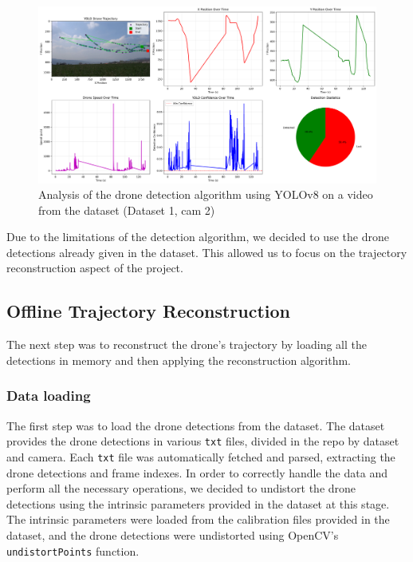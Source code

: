 \documentclass[11pt]{article}
\begin{document}
\begin{figure}[H]
    \centering
    \includegraphics[width=\textwidth]{imgs/yolo_analysis.png}
    \caption{Analysis of the drone detection algorithm using YOLOv8 on a video from the dataset (Dataset 1, cam 2)}
    \label{fig:yolo_analysis}
\end{figure}

Due to the limitations of the detection algorithm, we decided to use the drone detections already given in the dataset. This allowed us to focus on the trajectory reconstruction aspect of the project.

\subsection{Offline Trajectory Reconstruction}

The next step was to reconstruct the drone's trajectory by loading all the detections in memory and then applying the reconstruction algorithm.

\subsubsection{Data loading}
\label{sec:data_loading}

The first step was to load the drone detections from the dataset. The dataset provides the drone detections in various \texttt{txt} files, divided in the repo by dataset and camera. Each \texttt{txt} file was automatically fetched and parsed, extracting the drone detections and frame indexes. In order to correctly handle the data and perform all the necessary operations, we decided to undistort the drone detections using the intrinsic parameters provided in the dataset at this stage. The intrinsic parameters were loaded from the calibration files provided in the dataset, and the drone detections were undistorted using OpenCV's \texttt{undistortPoints} function.
\end{document}
